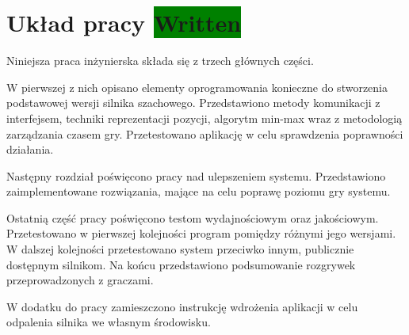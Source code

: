 \section{Układ pracy \colorbox{green}{Written}}
\label{sec:uklad-pracy}

Niniejsza praca inżynierska składa się z trzech głównych części.

W pierwszej z nich opisano elementy oprogramowania konieczne do stworzenia podstawowej wersji silnika szachowego.
Przedstawiono metody komunikacji z interfejsem, techniki reprezentacji pozycji, algorytm min-max wraz z metodologią zarządzania czasem gry.
Przetestowano aplikację w celu sprawdzenia poprawności działania.

Następny rozdział poświęcono pracy nad ulepszeniem systemu.
Przedstawiono zaimplementowane rozwiązania, mające na celu poprawę poziomu gry systemu.

Ostatnią część pracy poświęcono testom wydajnościowym oraz jakościowym.
Przetestowano w pierwszej kolejności program pomiędzy różnymi jego wersjami.
W dalszej kolejności przetestowano system przeciwko innym, publicznie dostępnym silnikom.
Na końcu przedstawiono podsumowanie rozgrywek przeprowadzonych z graczami.

W dodatku do pracy zamieszczono instrukcję wdrożenia aplikacji w celu odpalenia silnika we własnym środowisku.